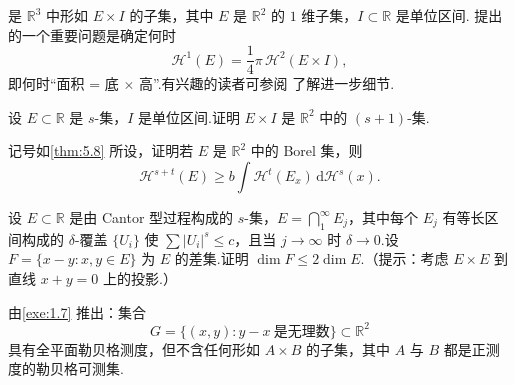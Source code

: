 是 $\mathbb{R}^3$ 中形如 $E\times I$ 的子集，其中 $E$ 是 $\mathbb{R}^2$ 的 $1$ 维子集，$I\subset\mathbb{R}$ 是单位区间.\textcite{randolph1936} 提出的一个重要问题是确定何时
\[
  \mathcal{H}^{1}(E)=\frac{1}{4}\pi\,\mathcal{H}^{2}(E\times I),
\]
即何时``面积 = 底 $\times$ 高''.有兴趣的读者可参阅 \textcites{besicovitchmoran1945,freilich1965,ward1967,larman1967c} 了解进一步细节.

\begin{exercises}
\item 设 $E\subset\mathbb{R}$ 是 $s$-集，$I$ 是单位区间.证明 $E\times I$ 是 $\mathbb{R}^2$ 中的 $(s+1)$-集.
\item 记号如\cref{thm:5.8} 所设，证明若 $E$ 是 $\mathbb{R}^2$ 中的 Borel 集，则
\[
  \mathcal{H}^{s+t}(E)\geq b\int\mathcal{H}^{t}(E_x)\,\mathrm{d}\mathcal{H}^{s}(x).
\]
\item 设 $E\subset\mathbb{R}$ 是由 Cantor 型过程构成的 $s$-集，$E=\bigcap_{1}^{\infty}E_j$，其中每个 $E_j$ 有等长区间构成的 $\delta$-覆盖 $\{U_i\}$ 使 $\sum|U_i|^s\leq c$，且当 $j\to\infty$ 时 $\delta\to 0$.设 $F=\{x-y:x,y\in E\}$ 为 $E$ 的差集.证明 $\dim F\leq 2\dim E$.（提示：考虑 $E\times E$ 到直线 $x+y=0$ 上的投影.）
\item 由\cref{exe:1.7} 推出：集合
\[
  G=\{(x,y):y-x\ \text{是无理数}\}\subset\mathbb{R}^2
\]
具有全平面勒贝格测度，但不含任何形如 $A\times B$ 的子集，其中 $A$ 与 $B$ 都是正测度的勒贝格可测集.
\end{exercises}
